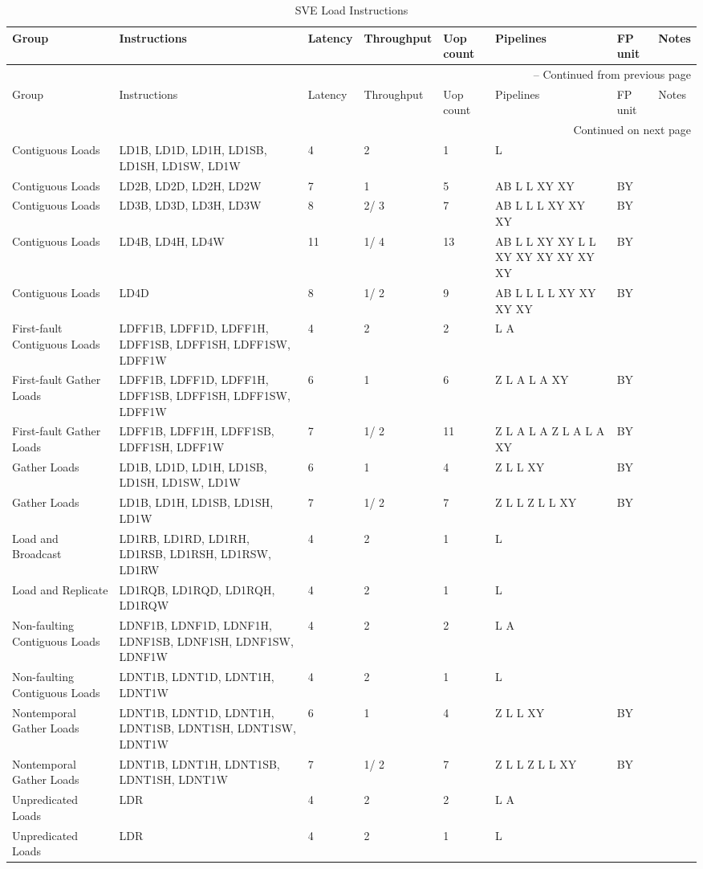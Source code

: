 \begin{longtable}{|p{1in}|p{1in}|l|l|l|p{1in}|l|p{1in}|}
\caption{SVE Load Instructions} \\
\hline
Group & Instructions & Latency & Throughput & Uop count & Pipelines & FP unit & Notes\\
\hline
\endfirsthead
\hline
\multicolumn{8}{|r|}{{\tablename\ \thetable{} -- Continued from previous page}} \\
\hline
Group & Instructions & Latency & Throughput & Uop count & Pipelines & FP unit & Notes\\
\hline
\endhead
\hline
\multicolumn{8}{|r|}{{Continued on next page}} \\
\hline
\endfoot
\hline
\endlastfoot
Contiguous Loads & LD1B, LD1D, LD1H, LD1SB, LD1SH, LD1SW, LD1W & 4 & 2 & 1 & L &  & \\
\hline
Contiguous Loads & LD2B, LD2D, LD2H, LD2W & 7 & 1 & 5 & AB L L XY XY & BY & \\
\hline
Contiguous Loads & LD3B, LD3D, LD3H, LD3W & 8 & 2/ 3 & 7 & AB L L L XY XY XY & BY & \\
\hline
Contiguous Loads & LD4B, LD4H, LD4W & 11 & 1/ 4 & 13 & AB L L XY XY L L XY XY XY XY XY XY & BY & \\
\hline
Contiguous Loads & LD4D & 8 & 1/ 2 & 9 & AB L L L L XY XY XY XY & BY & \\
\hline
First-fault Contiguous Loads & LDFF1B, LDFF1D, LDFF1H, LDFF1SB, LDFF1SH, LDFF1SW, LDFF1W & 4 & 2 & 2 & L A &  & \\
\hline
First-fault Gather Loads & LDFF1B, LDFF1D, LDFF1H, LDFF1SB, LDFF1SH, LDFF1SW, LDFF1W & 6 & 1 & 6 & Z L A L A XY & BY & \\
\hline
First-fault Gather Loads & LDFF1B, LDFF1H, LDFF1SB, LDFF1SH, LDFF1W & 7 & 1/ 2 & 11 & Z L A L A Z L A L A XY & BY & \\
\hline
Gather Loads & LD1B, LD1D, LD1H, LD1SB, LD1SH, LD1SW, LD1W & 6 & 1 & 4 & Z L L XY & BY & \\
\hline
Gather Loads & LD1B, LD1H, LD1SB, LD1SH, LD1W & 7 & 1/ 2 & 7 & Z L L Z L L XY & BY & \\
\hline
Load and Broadcast & LD1RB, LD1RD, LD1RH, LD1RSB, LD1RSH, LD1RSW, LD1RW & 4 & 2 & 1 & L &  & \\
\hline
Load and Replicate & LD1RQB, LD1RQD, LD1RQH, LD1RQW & 4 & 2 & 1 & L &  & \\
\hline
Non-faulting Contiguous Loads & LDNF1B, LDNF1D, LDNF1H, LDNF1SB, LDNF1SH, LDNF1SW, LDNF1W & 4 & 2 & 2 & L A &  & \\
\hline
Non-faulting Contiguous Loads & LDNT1B, LDNT1D, LDNT1H, LDNT1W & 4 & 2 & 1 & L &  & \\
\hline
Nontemporal Gather Loads & LDNT1B, LDNT1D, LDNT1H, LDNT1SB, LDNT1SH, LDNT1SW, LDNT1W & 6 & 1 & 4 & Z L L XY & BY & \\
\hline
Nontemporal Gather Loads & LDNT1B, LDNT1H, LDNT1SB, LDNT1SH, LDNT1W & 7 & 1/ 2 & 7 & Z L L Z L L XY & BY & \\
\hline
Unpredicated Loads & LDR & 4 & 2 & 2 & L A &  & \\
\hline
Unpredicated Loads & LDR & 4 & 2 & 1 & L &  & \\
\hline
\end{longtable}
